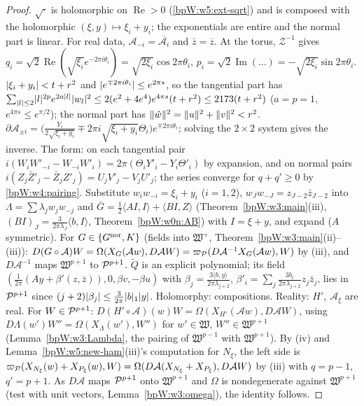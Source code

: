 \begin{proof}
\label{stepW:w5:a-hol} $\sqrt\cdot$ is holomorphic on $\operatorname{Re}>0$
(\ref{bpW:w5:ext-sqrt}) and is composed with the holomorphic $(\xi,y)\mapsto\xi_i+y_i$; the exponentials are entire and the
normal part is linear. For real data, $\mathcal A_{-i}=\overline{\mathcal A_i}$ and $\bar z=\overline z$. At the torus,
$\mathcal Z^{-1}$ gives $q_i=\sqrt2\operatorname{Re}(\sqrt{\xi_i}e^{-2\pi i\theta_i})=\sqrt{2\xi_i}\cos2\pi\theta_i$,
$p_i=\sqrt2\operatorname{Im}(\dots)=-\sqrt{2\xi_i}\sin2\pi\theta_i$.
\label{stepW:w5:a-dom} $\lvert \xi_i+y_i\rvert<t+r^2$ and $\lvert e^{\mp2\pi i\theta_i}\rvert\le e^{2\pi s}$, so the tangential
part has $\sum_{\lvert l\rvert\le2}\lvert l\rvert^{2p}e^{2a\lvert l\rvert}\lvert w_l\rvert^2\le2(e^2+4e^4)e^{4\pi s}(t+r^2)\le2173(t+r^2)$ ($a=p=1$,
$e^{4\pi s}\le e^{\pi/2}$); the normal part has $\lVert \hat w\rVert^2=\lVert u\rVert^2+\lVert v\rVert^2<r^2$.
\label{stepW:w5:a-der} $\partial\mathcal A_{\pm i}=\bigl(\frac{Y_i}{2\sqrt{\xi_i+y_i}}\mp2\pi i\sqrt{\xi_i+y_i}\Theta_i\bigr)e^{\mp2\pi i\theta_i}$;
solving the $2\times2$ system gives the inverse. The form: on each tangential pair
$i(W_iW'_{-i}-W_{-i}W'_i)=2\pi(\Theta_iY'_i-Y_i\Theta'_i)$ by expansion, and on normal pairs
$i(Z_j\bar Z'_j-\bar Z_jZ'_j)=U_jV'_j-V_jU'_j$; the series converge for $q+q'\ge0$ by \eqref{bpW:w4:pairing}.
\label{stepW:w5:a-nf} Substitute $w_iw_{-i}=\xi_i+y_i$ ($i=1,2$), $w_Jw_{-J}=z_{J-2}\bar z_{J-2}$
into $\Lambda=\sum\lambda_jw_jw_{-j}$ and $\bar G=\frac12\langle AI,I\rangle+\langle BI,Z\rangle$
(Theorem~\ref{bpW:w3:main}(iii), $(BI)_J=\frac3{2\pi\lambda_J}\langle b,I\rangle$, Theorem~\ref{bpW:w0n:AB}) with $I=\xi+y$, and
expand ($A$ symmetric).
\label{stepW:w5:a-field} For $G\in\{G^{\rm nor},K\}$ (fields into $\mathfrak W^+$, Theorem~\ref{bpW:w3:main}(ii)--(iii)):
$D(G\circ\mathcal A)W=\Omega(X_G(\mathcal Aw),D\mathcal AW)=\varpi_{\mathcal P}(D\mathcal A^{-1}X_G(\mathcal Aw),W)$ by (iii), and
$D\mathcal A^{-1}$ maps $\mathfrak W^{p+1}$ to $\mathcal P^{p+1}$. $\tilde Q$ is an explicit polynomial; its field
$(\frac1{2\pi}(Ay+\beta'(z,\bar z)),0,\beta v,-\beta u)$ with $\beta_j=\frac{3\langle b,y\rangle}{2\pi\lambda_{j+2}}$,
$\beta'_i=\sum_j\frac{3b_i}{2\pi\lambda_{j+2}}z_j\bar z_j$, lies in $\mathcal P^{p+1}$ since $(j+2)\lvert \beta_j\rvert\le\frac3{2\pi}\lvert b\rvert_1\lvert y\rvert$.
Holomorphy: compositions. Reality: $H'$, $\mathcal A_\xi$ are real.
\label{stepW:w5:a-conj} For $W\in\mathcal P^{p+1}$: $D(H'\circ\mathcal A)(w)W=\Omega(X_{H'}(\mathcal Aw),D\mathcal AW)$,
using $D\Lambda(w')W''=\Omega(X_\Lambda(w'),W'')$ for $w'\in\mathfrak W$, $W''\in\mathfrak W^{p+1}$
(Lemma~\ref{bpW:w3:Lambda}, the pairing of $\mathfrak W^{p-1}$ with $\mathfrak W^{p+1}$). By (iv) and Lemma~\ref{bpW:w5:new-ham}(iii)'s
computation for $N_\xi$, the left side is $\varpi_{\mathcal P}(X_{N_\xi}(w)+X_{P_\xi}(w),W)=\Omega(D\mathcal A(X_{N_\xi}+X_{P_\xi}),D\mathcal AW)$
by (iii) with $q=p-1$, $q'=p+1$. As $D\mathcal A$ maps $\mathcal P^{p+1}$ onto $\mathfrak W^{p+1}$ and $\Omega$ is nondegenerate
against $\mathfrak W^{p+1}$ (test with unit vectors, Lemma~\ref{bpW:w3:omega}), the identity follows.
\end{proof}
